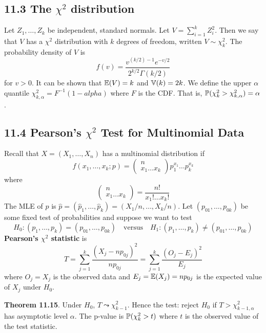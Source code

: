 \subsection*{\texorpdfstring{11.3 The \(\chi^{2}\)
distribution}{11.3 The \textbackslash chi^{2} distribution}}\label{chi2:dist}
Let \(Z_{1}, \dots, Z_{k}\) be independent, standard normals. Let
\(V = \sum_{i=1}^{k} Z_{i}^{2}\). Then we say that \(V\) has a \(\chi^{2}\)
distribution with \(k\) degrees of freedom, written \(V \sim \chi^{2}_{k}\).
The probability density of \(V\) is
\[
f(v) = \frac{v^{(k/2) - 1}e^{-v/2}}{2^{k/2} \Gamma(k / 2)}
\]
for \(v > 0\). It can be shown that \(\operatorname{\mathbb{E}}(V) = k\) and
\(\operatorname{\mathbb{V}}(k) = 2k\). We define the upper \(\alpha\) quantile
\(\chi^{2}_{k, \alpha} = F^{-1}(1 - alpha)\) where \(F\) is the CDF. That
is, \(\operatorname{\mathbb{P}}(\chi^{2}_{k} > \chi^{2}_{k, \alpha}) = \alpha\).

\subsection*{\texorpdfstring{11.4 Pearson's \(\chi^{2}\) Test for
Multinomial
Data}{11.4 Pearson's \textbackslash chi^{2} Test for Multinomial Data}}\label{pearsons-chi2-test-for-multinomial-data}
Recall that \(X = (X_{1}, \dots, X_{n})\) has a multinomial distribution if
\[
f(x_{1}, \dots, x_{k}; p) = \begin{pmatrix}
n \\
x_{1} \dots x_{k}
\end{pmatrix} p_{1}^{x_{1}} \dots p_{k}^{x_{k}}
\]
where
\[
\begin{pmatrix}
n \\
x_{1} \dots x_{k}
\end{pmatrix} = 
\frac{n!}{x_{1}! \dots x_{k}!}
\]
The MLE of \(p\) is
\(\hat{p} = (\hat{p}_{1}, \dots, \hat{p}_{k}) = \left(X_{1} / n, \dots, X_{k} / n\right)\).
Let \((p_{01}, \dots, p_{0k})\) be some fixed test of probabilities and
suppose we want to test
\[
H_{0}: (p_{1}, \dots, p_{k}) = (p_{01}, \dots, p_{0k})
\quad \text{versus} \quad
H_{1}: (p_{1}, \dots, p_{k}) \neq (p_{01}, \dots, p_{0k})
\]
\textbf{Pearson's \(\chi^{2}\) statistic} is
\[
T = \sum_{j=1}^{k} \frac{(X_{j} - np_{0j})^{2}}{np_{0j}} = \sum_{j=1}^{k} \frac{(O_{j} - E_{j})^{2}}{E_{j}}
\]
where \(O_{j} = X_{j}\) is the observed data and
\(E_{j} = \operatorname{\mathbb{E}}(X_{j}) = np_{0j}\) is the expected value of \(X_{j}\)
under \(H_{0}\).

\textbf{Theorem 11.15}. Under \(H_{0}\), \(T \leadsto \chi^{2}_{k - 1}\).
Hence the test: reject \(H_{0}\) if \(T > \chi^{2}_{k - 1, \alpha}\) has
asymptotic level \(\alpha\). The p-value is \(\operatorname{\mathbb{P}}(\chi^{2}_{k} > t)\)
where \(t\) is the observed value of the test statistic.

